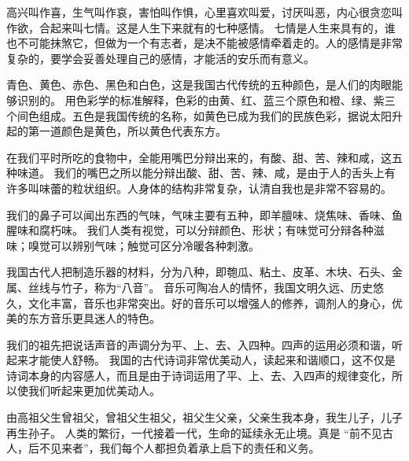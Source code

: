 \documentclass[avery5371,grid]{flashcards}
\begin{document}
{高兴叫作喜，生气叫作哀，害怕叫作惧，心里喜欢叫爱，讨厌叫恶，内心很贪恋叫作欲，合起来叫七情。这是人生下来就有的七种感情。} %
{七情是人生来具有的，谁也不可能抹煞它，但做为一个有志者，是决不能被感情牵着走的。人的感情是非常复杂的，要学会妥善处理自己的感情，才能活的安乐而有意义。} %


{青色、黄色、赤色、黑色和白色，这是我国古代传统的五种颜色，是人们的肉眼能够识别的。} %
{用色彩学的标准解释，色彩的由黄、红、蓝三个原色和橙、绿、紫三个间色组成。五色是我国传统的名称，如黄色已成为我们的民族色彩，据说太阳升起的第一道颜色是黄色，所以黄色代表东方。} %

{在我们平时所吃的食物中，全能用嘴巴分辩出来的，有酸、甜、苦、辣和咸，这五种味道。} %
{我们的嘴巴之所以能分辩出酸、甜、苦、辣、咸，是由于人的舌头上有许多叫味蕾的粒状组织。人身体的结构非常复杂，认清自我也是非常不容易的。} %

{我们的鼻子可以闻出东西的气味，气味主要有五种，即羊膻味、烧焦味、香味、鱼腥味和腐朽味。} %
{我们人类有视觉，可以分辩颜色、形状；有味觉可分辩各种滋味；嗅觉可以辨别气味；触觉可区分冷暖各种刺激。} %


{我国古代人把制造乐器的材料，分为八种，即匏瓜、粘土、皮革、木块、石头、金属、丝线与竹子，称为“八音”。} %
{音乐可陶冶人的情怀，我国文明久远、历史悠久，文化丰富，音乐也非常突出。好的音乐可以增强人的修养，调剂人的身心，优美的东方音乐更具迷人的特色。} %

{我们的祖先把说话声音的声调分为平、上、去、入四种。四声的运用必须和谐，听起来才能使人舒畅。} %
{我国的古代诗词非常优美动人，读起来和谐顺口，这不仅是诗词本身的内容感人，而且是由于诗词运用了平、上、去、入四声的规律变化，所以使我们听起来更加优美动人。} %

{由高祖父生曾祖父，曾祖父生祖父，祖父生父亲，父亲生我本身，我生儿子，儿子再生孙子。} %
{人类的繁衍，一代接着一代，生命的延续永无止境。真是 “前不见古人，后不见来者”，我们每个人都担负着承上启下的责任和义务。} %
\end{document}

